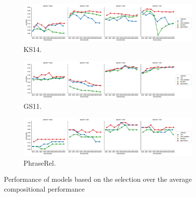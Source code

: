 \begin{figure}
  \centering

  \begin{subfigure}[t]{\textwidth}
    \includegraphics[width=\textwidth]{supplement/figures/compositional-results-ks14}
    \caption{KS14.}
    \label{fig:compositional-results-ks14}
  \end{subfigure}

  \begin{subfigure}[t]{\textwidth}
    \includegraphics[width=\textwidth]{supplement/figures/compositional-results-gs11}
    \caption{GS11.}
    \label{fig:compositional-results-gs11}
  \end{subfigure}

  \begin{subfigure}[t]{\textwidth}
    \includegraphics[width=\textwidth]{supplement/figures/compositional-results-phraserel}
    \caption{PhraseRel.}
    \label{fig:compositional-results-phraserel}
  \end{subfigure}


  \caption{Performance of models based on the selection over the average compositional performance}
  \label{fig:compositional-results}
\end{figure}


